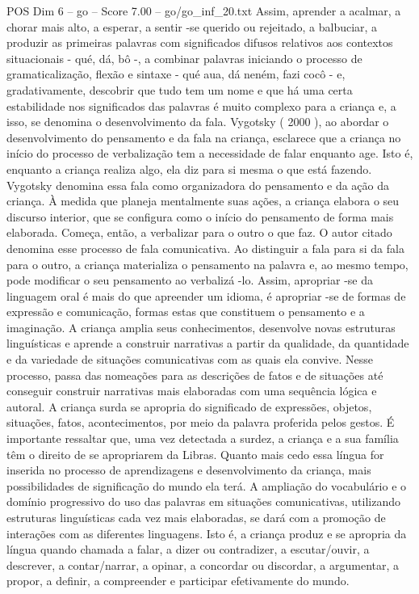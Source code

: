\begin{textsample}{POS Dim 6 – go – Score 7.00 – go/go\_inf\_20.txt}
Assim, aprender a acalmar, a chorar mais alto, a esperar, a sentir -se querido ou rejeitado, a balbuciar, a produzir as primeiras palavras com significados difusos relativos aos contextos situacionais - qué, dá, bô -, a combinar palavras iniciando o processo de gramaticalização, flexão e sintaxe - qué aua, dá neném, fazi cocô - e, gradativamente, descobrir que tudo tem um nome e que há uma certa estabilidade nos significados das palavras é muito complexo para a criança e, a isso, se denomina o desenvolvimento da fala.
Vygotsky ( 2000 ), ao abordar o desenvolvimento do pensamento e da fala na criança, esclarece que a criança no início do processo de verbalização tem a necessidade de falar enquanto age.
Isto é, enquanto a criança realiza algo, ela diz para si mesma o que está fazendo.
Vygotsky denomina essa fala como organizadora do pensamento e da ação da criança.
À medida que planeja mentalmente suas ações, a criança elabora o seu discurso interior, que se configura como o início do pensamento de forma mais elaborada.
Começa, então, a verbalizar para o outro o que faz.
O autor citado denomina esse processo de fala comunicativa.
Ao distinguir a fala para si da fala para o outro, a criança materializa o pensamento na palavra e, ao mesmo tempo, pode modificar o seu pensamento ao verbalizá -lo.
Assim, apropriar -se da linguagem oral é mais do que apreender um idioma, é apropriar -se de formas de expressão e comunicação, formas estas que constituem o pensamento e a imaginação.
A criança amplia seus conhecimentos, desenvolve novas estruturas linguísticas e aprende a construir narrativas a partir da qualidade, da quantidade e da variedade de situações comunicativas com as quais ela convive.
Nesse processo, passa das nomeações para as descrições de fatos e de situações até conseguir construir narrativas mais elaboradas com uma sequência lógica e autoral.
A criança surda se apropria do significado de expressões, objetos, situações, fatos, acontecimentos, por meio da palavra proferida pelos gestos.
É importante ressaltar que, uma vez detectada a surdez, a criança e a sua família têm o direito de se apropriarem da Libras.
Quanto mais cedo essa língua for inserida no processo de aprendizagens e desenvolvimento da criança, mais possibilidades de significação do mundo ela terá.
A ampliação do vocabulário e o domínio progressivo do uso das palavras em situações comunicativas, utilizando estruturas linguísticas cada vez mais elaboradas, se dará com a promoção de interações com as diferentes linguagens.
Isto é, a criança produz e se apropria da língua quando chamada a falar, a dizer ou contradizer, a escutar/ouvir, a descrever, a contar/narrar, a opinar, a concordar ou discordar, a argumentar, a propor, a definir, a compreender e participar efetivamente do mundo.

\end{textsample}
